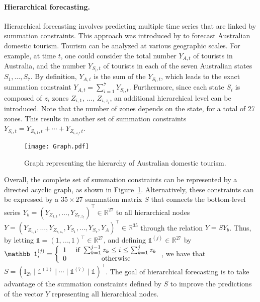 \paragraph{Hierarchical forecasting.} Hierarchical forecasting involves predicting multiple time series that are linked by summation constraints. This approach was introduced by \citet{athanasopoulos2009hierarchical} to forecast Australian domestic tourism. Tourism can be analyzed at various geographic scales. 
For example, at time $t$, one could consider the total number $Y_{A,t}$ of tourists in Australia, and the number $Y_{S_i,t}$ of tourists in each of the seven Australian states $S_1,\hdots, S_7$. By definition, $Y_{A,t}$ is the sum of the $Y_{S_i, t}$, which leads to the exact summation constraint $Y_{A,t} = \sum_{i=1}^7 Y_{S_i, t}$. Furthermore, since each state $S_i$ is composed of $z_i$ zones $Z_{i,1}$, $\dots$, $Z_{i, z_i}$, an additional hierarchical level can be introduced. 
Note that the number of zones depends on the state, for a total of 27 zones.
This results in another set of summation constraints
$Y_{S_i, t} =  Y_{Z_{i,1}, t}+\cdots + Y_{Z_{i,z_i}, t}$. 
\begin{figure}
    \centering
    \texttt{[image: Graph.pdf]}
    \caption{Graph representing the hierarchy of Australian domestic tourism.}
    \label{fig:DAC}
\end{figure}
Overall, the complete set of summation constraints can be represented by a directed acyclic graph, as shown in Figure~\ref{fig:DAC}. 
Alternatively, these constraints can be expressed by a $35 \times 27$ summation matrix $S$ that connects the bottom-level series $Y_b= ( Y_{Z_{1,1}},\hdots, Y_{Z_{7,z_7}})^\top \in \mathbb R^{27}$ to all hierarchical nodes $Y = (Y_{Z_{1,1}},\dots, Y_{Z_{7,z_7}}, Y_{S_1}, \hdots, Y_{S_7}, Y_A)^\top \in \mathbb R^{35}$ through the relation $Y = S Y_b$.
Thus, by letting $\mathbb 1 = (1, \hdots, 1)^\top \in \mathbb{R}^{27}$, and defining $\mathbb 1^{(j)}\in \mathbb R^{27}$ by $\mathbb 1^{(j)}_i = \left\{\begin{array}{cc}
     1 &   \hbox{ if } \sum_{k=1}^{j-1} z_k \leq i \leq \sum_{k=1}^j z_k\\
     0 &   \hbox{ otherwise}
\end{array}\right.$,  we have that $S = (\mathrm{I}_{27} \mid \mathbb 1^{(1)} \mid \cdots \mid \mathbb 1^{(7)} \mid  \mathbb 1)^\top$. 
The goal of hierarchical forecasting is to take advantage of the summation constraints defined by $S$ to improve the predictions of the vector $Y$ representing all hierarchical nodes.

